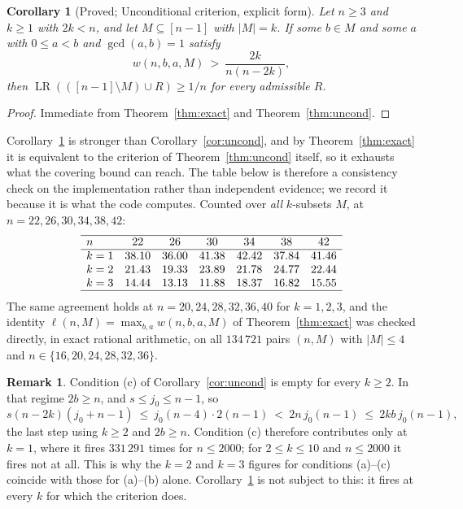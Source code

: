 \documentclass[11pt]{amsart}
\theoremstyle{plain}
\newtheorem{corollary}[theorem]{Corollary}
\theoremstyle{definition}
\newtheorem{remark}[theorem]{Remark}
\newcommand{\LR}{\operatorname{LR}}
\begin{document}
\begin{corollary}[Proved; Unconditional criterion, explicit form]\label{cor:window}
Let $n\ge3$ and $k\ge1$ with $2k<n$, and let $M\subseteq[n-1]$ with $|M|=k$. If some $b\in M$ and
some $a$ with $0\le a<b$ and $\gcd(a,b)=1$ satisfy
\[
  w(n,b,a,M)\ >\ \frac{2k}{n(n-2k)},
\]
then $\LR(([n-1]\setminus M)\cup R)\ge 1/n$ for every admissible $R$.
\end{corollary}

\begin{proof}
Immediate from Theorem~\ref{thm:exact} and Theorem~\ref{thm:uncond}.
\end{proof}

Corollary~\ref{cor:window} is stronger than Corollary~\ref{cor:uncond}, and by
Theorem~\ref{thm:exact} it is equivalent to the criterion of Theorem~\ref{thm:uncond} itself, so it
exhausts what the covering bound can reach. The table below is therefore a consistency check on the
implementation rather than independent evidence; we record it because it is what the code computes.
Counted over \emph{all} $k$-subsets $M$, at $n=22,26,30,34,38,42$:
\[
\begin{array}{lcccccc}
\hline
n & 22 & 26 & 30 & 34 & 38 & 42\\
\hline
k=1 & 38.10 & 36.00 & 41.38 & 42.42 & 37.84 & 41.46\\
k=2 & 21.43 & 19.33 & 23.89 & 21.78 & 24.77 & 22.44\\
k=3 & 14.44 & 13.13 & 11.88 & 18.37 & 16.82 & 15.55\\
\hline
\end{array}
\]
The same agreement holds at $n=20,24,28,32,36,40$ for $k=1,2,3$, and the identity
$\ell(n,M)=\max_{b,a}w(n,b,a,M)$ of Theorem~\ref{thm:exact} was checked directly, in exact rational
arithmetic, on all $134\,721$ pairs $(n,M)$ with $|M|\le4$ and $n\in\{16,20,24,28,32,36\}$.

\begin{remark}\label{rem:cempty}
Condition (c) of Corollary~\ref{cor:uncond} is empty for every $k\ge2$. In that regime $2b\ge n$,
and $s\le j_0\le n-1$, so
\[
  s(n-2k)(j_0+n-1)\ \le\ j_0(n-4)\cdot 2(n-1)\ <\ 2n\,j_0(n-1)\ \le\ 2kb\,j_0(n-1),
\]
the last step using $k\ge2$ and $2b\ge n$. Condition (c) therefore contributes only at $k=1$, where
it fires $331\,291$ times for $n\le2000$; for $2\le k\le10$ and $n\le2000$ it fires not at all. This
is why the $k=2$ and $k=3$ figures for conditions (a)--(c) coincide with those for (a)--(b) alone.
Corollary~\ref{cor:window} is not subject to this: it fires at every $k$ for which the criterion
does.
\end{remark}
\end{document}
